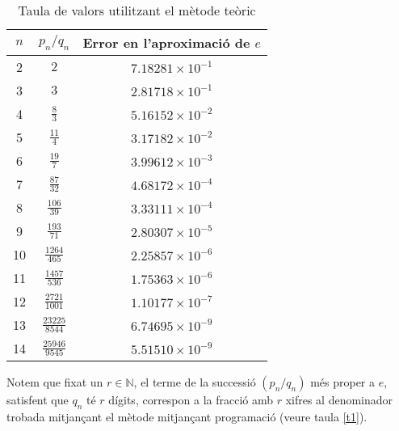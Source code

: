 \documentclass[11pt,a4paper]{article}
\theoremstyle{definition}
\begin{document}
\begin{enumerate}
          \begin{table}[!ht]
              \centering
              \begin{tabular}{|c|c|c|}
                  \hline
                  $n$ & $p_n/q_n$                         & Error en l'aproximació de $e$ \\
                  \hline
                  2   & $2$                               & $7.18281\times 10^{-1}$       \\[3pt]
                  \hline
                  3   & $3$                               & $2.81718\times 10^{-1}$       \\[3pt]
                  \hline
                  4   & $\displaystyle\frac{8}{3}$        & $5.16152\times 10^{-2}$       \\[3pt]
                  \hline
                  5   & $\displaystyle\frac{11}{4}$       & $3.17182\times 10^{-2}$       \\[3pt]
                  \hline
                  6   & $\displaystyle\frac{19}{7}$       & $3.99612\times 10^{-3}$       \\[3pt]
                  \hline
                  7   & $\displaystyle\frac{87}{32}$      & $4.68172\times 10^{-4}$       \\[3pt]
                  \hline
                  8   & $\displaystyle\frac{106}{39}$     & $3.33111\times 10^{-4}$       \\[3pt]
                  \hline
                  9   & $\displaystyle\frac{193}{71}$     & $2.80307\times 10^{-5}$       \\[3pt]
                  \hline
                  10  & $\displaystyle\frac{1264}{465}$   & $2.25857\times 10^{-6}$       \\[3pt]
                  \hline
                  11  & $\displaystyle\frac{1457}{536}$   & $1.75363\times 10^{-6}$       \\[3pt]
                  \hline
                  12  & $\displaystyle\frac{2721}{1001}$  & $1.10177\times 10^{-7}$       \\[3pt]
                  \hline
                  13  & $\displaystyle\frac{23225}{8544}$ & $6.74695\times 10^{-9}$       \\[3pt]
                  \hline
                  14  & $\displaystyle\frac{25946}{9545}$ & $5.51510\times 10^{-9}$       \\[3pt]
                  \hline
              \end{tabular}
              \caption{Taula de valors utilitzant el mètode teòric}
              \label{t2}
          \end{table}
          Notem que fixat un $r\in\mathbb{N}$, el terme de la successió $(p_n/q_n)$ més proper a $e$, satisfent que $q_n$ té $r$ dígits, correspon a la fracció amb $r$ xifres al denominador trobada mitjançant el mètode mitjançant programació (veure taula \ref{t1}).
\end{enumerate}
\printbibliography[heading=bibintoc,title={Referències}]
\end{document}
